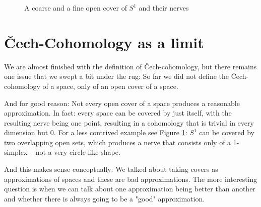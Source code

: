 \begin{figure}
	\centering
	\begin{tcolorbox}[segmentation style={solid}]
	    \begin{tcbraster}[raster columns=2]
		\end{tcbraster}
		\tcblower
		\begin{tcbraster}[raster columns=2]
	    \end{tcbraster}
	\end{tcolorbox}
	\label{figure:circle_nerves}
	\caption{A coarse and a fine open cover of $S^1$ and their nerves}
\end{figure}

\section{Čech-Cohomology as a limit}
We are almost finished with the definition of Čech-cohomology, but there remains one issue that we
swept a bit under the rug: So far we did not define the Čech-cohomology of a space, only of an open
cover of a space.

And for good reason: Not every open cover of a space produces a reasonable approximation. In fact: every
space can be covered by just itself, with the resulting nerve being one point, resulting in a cohomology
that is trivial in every dimension but 0. For a less contrived example see Figure \ref{figure:circle_nerves}:
$S^1$ can be covered by two overlapping open sets, which produces a nerve that consists only of a 1-simplex –
not a very circle-like shape.

And this makes sense conceptually: We talked about taking covers as approximations of spaces
and these are bad approximations. The more interesting question is when we can talk about one approximation being better
than another and whether there is always going to be a "good" approximation. 

